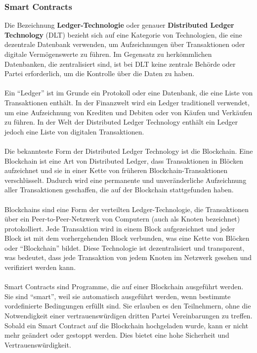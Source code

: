 \subsubsection{Smart Contracts}

Die Bezeichnung \textbf{Ledger-Technologie} oder genauer \textbf{Distributed Ledger Technology} (DLT) bezieht sich auf eine Kategorie von Technologien, die eine dezentrale Datenbank verwenden, um Aufzeichnungen über Transaktionen oder digitale Vermögenswerte zu führen. Im Gegensatz zu herkömmlichen Datenbanken, die zentralisiert sind, ist bei DLT keine zentrale Behörde oder Partei erforderlich, um die Kontrolle über die Daten zu haben.
\\\\
Ein \enquote{Ledger} ist im Grunde ein Protokoll oder eine Datenbank, die eine Liste von Transaktionen enthält. In der Finanzwelt wird ein Ledger traditionell verwendet, um eine Aufzeichnung von Krediten und Debiten oder von Käufen und Verkäufen zu führen. In der Welt der Distributed Ledger Technology enthält ein Ledger jedoch eine Liste von digitalen Transaktionen.
\\\\
Die bekannteste Form der Distributed Ledger Technology ist die Blockchain. Eine Blockchain ist eine Art von Distributed Ledger, dass Transaktionen in Blöcken aufzeichnet und sie in einer Kette von früheren Blockchain-Transaktionen verschlüsselt. Dadurch wird eine permanente und unveränderliche Aufzeichnung aller Transaktionen geschaffen, die auf der Blockchain stattgefunden haben.
\\\\
Blockchains sind eine Form der verteilten Ledger-Technologie, die Transaktionen über ein Peer-to-Peer-Netzwerk von Computern (auch als Knoten bezeichnet) protokolliert. Jede Transaktion wird in einem Block aufgezeichnet und jeder Block ist mit dem vorhergehenden Block verbunden, was eine Kette von Blöcken oder  \enquote{Blockchain} bildet. Diese Technologie ist dezentralisiert und transparent, was bedeutet, dass jede Transaktion von jedem Knoten im Netzwerk gesehen und verifiziert werden kann.
\\\\
Smart Contracts sind Programme, die auf einer Blockchain ausgeführt werden. Sie sind \enquote{smart}, weil sie automatisch ausgeführt werden, wenn bestimmte vordefinierte Bedingungen erfüllt sind. Sie erlauben es den Teilnehmern, ohne die Notwendigkeit einer vertrauenswürdigen dritten Partei Vereinbarungen zu treffen. Sobald ein Smart Contract auf die Blockchain hochgeladen wurde, kann er nicht mehr geändert oder gestoppt werden. Dies bietet eine hohe Sicherheit und Vertrauenswürdigkeit.
